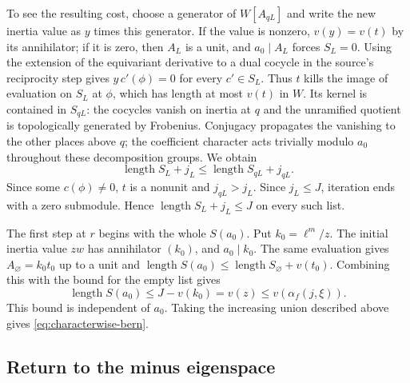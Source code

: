To see the resulting cost, choose a generator of \(W[A_{qL}]\)
and write the new inertia value as \(y\) times this generator. If
the value is nonzero, \(v(y)=v(t)\) by its annihilator; if it is zero,
then \(A_L\) is a unit, and \(a_0\mid A_L\) forces \(S_L=0\).
Using the extension of the equivariant derivative to a dual cocycle
in the source's reciprocity step gives \(y\,c'(\phi)=0\) for every
\(c'\in S_L\). Thus \(t\) kills the image of evaluation on \(S_L\)
at \(\phi\), which has length at most \(v(t)\) in \(W\). Its kernel
is contained in \(S_{qL}\): the cocycles vanish on inertia at \(q\)
and the unramified quotient is topologically generated by Frobenius.
Conjugacy propagates the vanishing to the other places above \(q\);
the coefficient character acts trivially modulo \(a_0\) throughout
these decomposition groups. We obtain
\[
   \operatorname{length}S_L+j_L
       \le \operatorname{length}S_{qL}+j_{qL}.
\]
Since some \(c(\phi)\ne0\), \(t\) is a nonunit and \(j_{qL}>j_L\).
Since \(j_L\le J\), iteration ends with a zero submodule. Hence
\(\operatorname{length}S_L+j_L\le J\) on every such list.

The first step at \(r\) begins with the whole \(S(a_0)\).
Put \(k_0=\ell^m/z\). The initial inertia value \(zw\) has
annihilator \((k_0)\), and \(a_0\mid k_0\). The same evaluation gives
\(A_{\varnothing}=k_0t_0\) up to a unit and
\(\operatorname{length}S(a_0)\le
  \operatorname{length}S_{\varnothing}+v(t_0)\).
Combining this with the bound for the empty list gives
\[
  \operatorname{length}S(a_0)
        \le J-v(k_0)=v(z)\le v(\alpha_f(j,\xi)).
\]
This bound is independent of \(a_0\). Taking the increasing union
described above gives \eqref{eq:characterwise-bern}.

\subsection{Return to the minus eigenspace}

